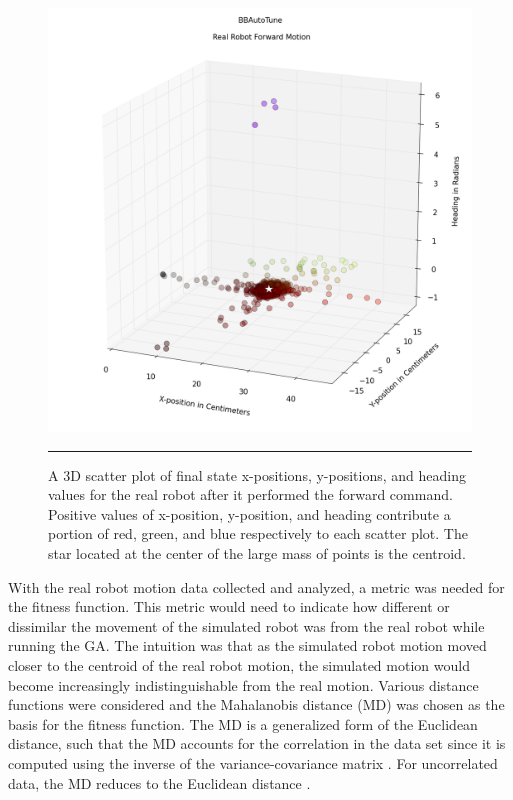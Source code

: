 \begin{figure}[htbp]
\centering
\includegraphics[scale=0.5]{../Figures/Chapter4/real_robot_3d_scatter.png}
\rule{35em}{0.5pt}
\caption[Real Robot Forward Motion 3D Scatter Plot]{A 3D scatter plot of final state x-positions, y-positions, and heading values for the real robot after it performed the forward command. Positive values of x-position, y-position, and heading contribute a portion of red, green, and blue respectively to each scatter plot. The star located at the center of the large mass of points is the centroid.}
\label{fig:real_robot_3d_scatter}
\end{figure}

With the real robot motion data collected and analyzed, a metric was needed for the fitness function. This metric would need to indicate how different or dissimilar the movement of the simulated robot was from the real robot while running the GA. The intuition was that as the simulated robot motion moved closer to the centroid of the real robot motion, the simulated motion would become increasingly indistinguishable from the real motion. Various distance functions were considered and the Mahalanobis distance (MD) was chosen as the basis for the fitness function. The MD is a generalized form of the Euclidean distance, such that the MD accounts for the correlation in the data set since it is computed using the inverse of the variance-covariance matrix \cite{mahalanobis_distance}. For uncorrelated data, the MD reduces to the Euclidean distance \cite{what_is_mahalanobis_distance}.

